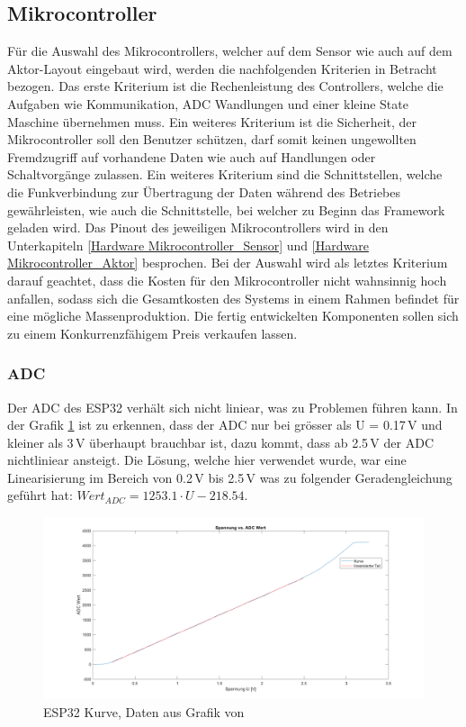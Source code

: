 \subsection{Mikrocontroller}\label{subsec: Mikrocontroller}
Für die Auswahl des Mikrocontrollers, welcher auf dem Sensor wie auch auf dem Aktor-Layout eingebaut wird, werden die nachfolgenden Kriterien in Betracht bezogen. Das erste Kriterium ist die Rechenleistung des Controllers, welche die Aufgaben wie Kommunikation, ADC Wandlungen und einer kleine State Maschine übernehmen muss.
Ein weiteres Kriterium ist die Sicherheit, der Mikrocontroller soll den Benutzer schützen, darf somit keinen ungewollten Fremdzugriff auf vorhandene Daten wie auch auf Handlungen oder Schaltvorgänge zulassen. Ein weiteres Kriterium sind die Schnittstellen, welche die Funkverbindung zur Übertragung der Daten während des Betriebes gewährleisten, wie auch die Schnittstelle, bei welcher zu Beginn das Framework geladen wird. Das Pinout des jeweiligen Mikrocontrollers wird in den Unterkapiteln \ref{Hardware Mikrocontroller_Sensor} und \ref{Hardware Mikrocontroller_Aktor} besprochen. Bei der Auswahl wird als letztes Kriterium darauf geachtet, dass die Kosten für den Mikrocontroller nicht wahnsinnig hoch anfallen, sodass sich die Gesamtkosten des Systems in einem Rahmen befindet für eine mögliche Massenproduktion. Die fertig entwickelten Komponenten sollen sich zu einem Konkurrenzfähigem Preis verkaufen lassen.
\subsubsection{ADC}
Der ADC des ESP32 verhält sich nicht liniear, was zu Problemen führen kann. In der Grafik \ref{pic: ESP32_Kurve} ist zu erkennen, dass der ADC nur bei grösser als U = 0.17\,V und kleiner als 3\,V überhaupt brauchbar ist, dazu kommt, dass ab 2.5\,V der ADC nichtliniear ansteigt. Die Lösung, welche hier verwendet wurde, war eine Linearisierung im Bereich von  0.2\,V bis 2.5\,V was zu folgender Geradengleichung geführt hat: $Wert_{ADC} = 1253.1\cdot U - 218.54$.
\begin{figure}[h!]
	\centering
	\includegraphics[width=\textwidth]{graphics/ESP32_Kurve.png}
	\caption{ESP32 Kurve, Daten aus Grafik von \cite{randomnerdtutorials_esp32_2019}}
	\label{pic: ESP32_Kurve}
\end{figure}

